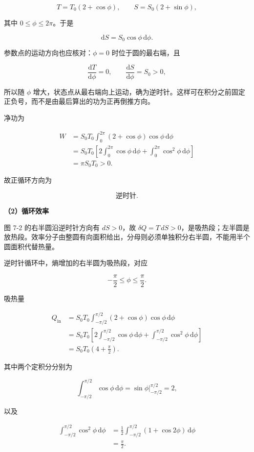 \documentclass[12pt,a4paper,UTF8]{ctexart}
\begin{document}
\[T=T_0(2+\cos\phi),\qquad
S=S_0(2+\sin\phi),\]

其中 \(0\leq\phi\leq2\pi\)。于是

\[\mathrm dS=S_0\cos\phi\,\mathrm d\phi.\]

参数点的运动方向也应核对：\(\phi=0\) 时位于圆的最右端，且

\[\frac{\mathrm dT}{\mathrm d\phi}=0,\qquad
\frac{\mathrm dS}{\mathrm d\phi}=S_0>0,\]

所以随 \(\phi\)
增大，状态点从最右端向上运动，确为逆时针。这样可在积分之前固定正负号，而不是由最后算出的功为正再倒推方向。

净功为

\[\begin{aligned}
W
&=S_0T_0\int_0^{2\pi}(2+\cos\phi)\cos\phi\,\mathrm d\phi\\
&=S_0T_0\left[2\int_0^{2\pi}\cos\phi\,\mathrm d\phi
+\int_0^{2\pi}\cos^2\phi\,\mathrm d\phi\right]\\
&=\pi S_0T_0>0.
\end{aligned} \tag{4}\]

故正循环方向为

\[\boxed{\text{逆时针}}. \tag{5}\]

\textbf{（2）循环效率}

图 7-2 的右半圆沿逆时针方向有 \(dS>0\)，故
\(\delta Q=T\,dS>0\)，是吸热段；左半圆是放热段。效率分子由整圆有向面积给出，分母则必须单独积分右半圆，不能用半个圆面积代替热量。

逆时针循环中，熵增加的右半圆为吸热段，对应

\[-\frac\pi2\leq\phi\leq\frac\pi2.\]

吸热量

\[\begin{aligned}
Q_{\mathrm{in}}
&=S_0T_0\int_{-\pi/2}^{\pi/2}
(2+\cos\phi)\cos\phi\,\mathrm d\phi\\
&=S_0T_0\left[
2\int_{-\pi/2}^{\pi/2}\cos\phi\,\mathrm d\phi
+\int_{-\pi/2}^{\pi/2}\cos^2\phi\,\mathrm d\phi
\right]\\
&=S_0T_0\left(4+\frac\pi2\right). 
\end{aligned} \tag{6}\]

其中两个定积分分别为

\[\int_{-\pi/2}^{\pi/2}\cos\phi\,\mathrm d\phi
=\left.\sin\phi\right|_{-\pi/2}^{\pi/2}=2,\]

以及

\[\begin{aligned}
\int_{-\pi/2}^{\pi/2}\cos^2\phi\,\mathrm d\phi
&=\frac12\int_{-\pi/2}^{\pi/2}(1+\cos2\phi)\,\mathrm d\phi\\
&=\frac\pi2.
\end{aligned}\]
\end{document}
